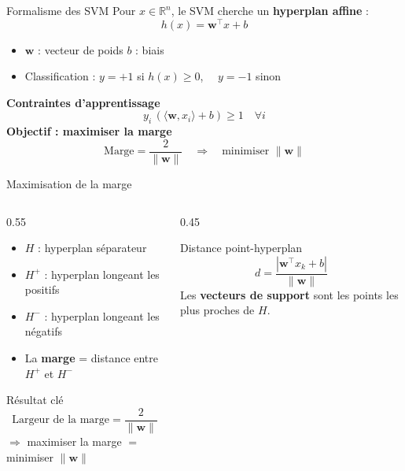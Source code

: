 \documentclass[11pt]{beamer}
\begin{document}
\begin{frame}{Formalisme des SVM}
    \small
    Pour $x \in \mathbb{R}^n$, le SVM cherche un \textbf{hyperplan affine} :
    \[
    h(x) = \mathbf{w}^\top x + b
    \]
    \begin{itemize}\scriptsize
        \item $\mathbf{w}$ : vecteur de poids \quad $b$ : biais
        \item Classification : $y = +1$ si $h(x) \geq 0$, $\quad y = -1$ sinon
    \end{itemize}
    \vspace{7pt}
    \textbf{Contraintes d'apprentissage}{\scriptsize
    \[
    y_i\,(\langle \mathbf{w}, x_i \rangle + b) \geq 1 \quad \forall i
    \]}
    \vspace{7pt}
    \textbf{Objectif : maximiser la marge}{\scriptsize
    \[
    \text{Marge} = \frac{2}{\|\mathbf{w}\|} \quad \Rightarrow \quad \text{minimiser } \|\mathbf{w}\|
    \]}
\end{frame}

\begin{frame}{Maximisation de la marge}
    \small
    \begin{columns}[T]
    \begin{column}{0.55\textwidth}
    \begin{itemize}\scriptsize
        \item $H$ : hyperplan séparateur
        \item $H^+$ : hyperplan longeant les positifs
        \item $H^-$ : hyperplan longeant les négatifs
        \item La \textbf{marge} = distance entre $H^+$ et $H^-$
    \end{itemize}
    \vspace{0.3cm}
    \begin{alertblock}{Résultat clé}\scriptsize
    \[
    \text{Largeur de la marge} = \frac{2}{\|\mathbf{w}\|}
    \]
    $\Rightarrow$ maximiser la marge $=$ minimiser $\|\mathbf{w}\|$
    \end{alertblock}
    \end{column}
    \begin{column}{0.45\textwidth}
    \begin{block}{Distance point-hyperplan}\scriptsize
    \[
    d = \frac{|\mathbf{w}^\top x_k + b|}{\|\mathbf{w}\|}
    \]
    Les \textbf{vecteurs de support} sont les points les plus proches de $H$.
    \end{block}
    \end{column}
    \end{columns}
\end{frame}
\end{document}
